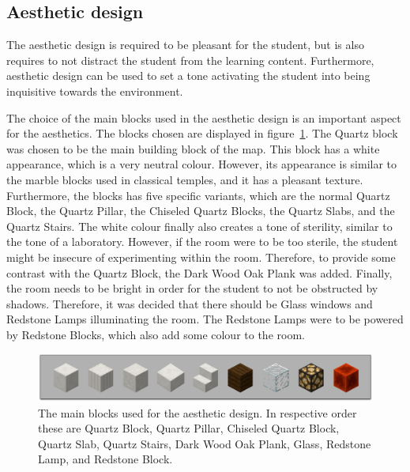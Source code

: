 \documentclass[11pt,twoside]{report} %
\begin{document}
\subsection{Aesthetic design}

The aesthetic design is required to be pleasant for the student, but is also requires to not distract the student from the learning content. Furthermore, aesthetic design can be used to set a tone activating the student into being inquisitive towards the environment.

The choice of the main blocks used in the aesthetic design is an important aspect for the aesthetics. The blocks chosen are displayed in figure~\ref{fig:blocks}. The Quartz block was chosen to be the main building block of the map. This block has a white appearance, which is a very neutral colour. However, its appearance is similar to the marble blocks used in classical temples, and it has a pleasant texture. Furthermore, the blocks has five specific variants, which are the normal Quartz Block, the Quartz Pillar, the Chiseled Quartz Blocks, the Quartz Slabs, and the Quartz Stairs. The white colour finally also creates a tone of sterility, similar to the tone of a laboratory. However, if the room were to be too sterile, the student might be insecure of experimenting within the room. Therefore, to provide some contrast with the Quartz Block, the Dark Wood Oak Plank was added. Finally, the room needs to be bright in order for the student to not be obstructed by shadows. Therefore, it was decided that there should be Glass windows and Redstone Lamps illuminating the room. The Redstone Lamps were to be powered by Redstone Blocks, which also add some colour to the room.

\begin{figure}[h]
\centering
\includegraphics[width=\textwidth]{blocks}
\caption{The main blocks used for the aesthetic design. In respective order these are Quartz Block, Quartz Pillar, Chiseled Quartz Block, Quartz Slab, Quartz Stairs, Dark Wood Oak Plank, Glass, Redstone Lamp, and Redstone Block. \label{fig:blocks}}
\end{figure}
\end{document}
